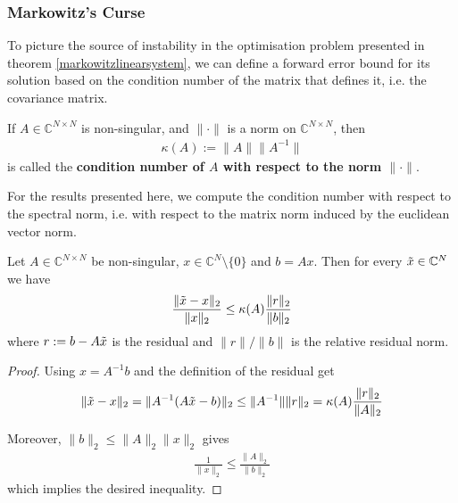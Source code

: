     \subsubsection{Markowitz's Curse}\label{markowitzscursesec}
        
		
		To picture the source of instability in the optimisation problem presented in theorem \ref{markowitzlinearsystem}, we can define a forward error bound for its solution based on the condition number of the matrix that defines it, i.e. the covariance matrix.
		
		\begin{definition}
		    If $A \in \mathbb{C}^{N \times N}$ is non-singular, and $\| \cdot \|$ is a norm on $\mathbb{C}^{N \times N}$, then
		    \begin{align*}
		        \kappa(A) := \| A \| \| A^{-1} \|
		    \end{align*}
		    is called the \textbf{condition number of $A$ with respect to the norm $\| \cdot \|$}.
		\end{definition}
		
		For the results presented here, we compute the condition number with respect to the spectral norm, i.e. with respect to the matrix norm induced by the euclidean vector norm.
		
		\begin{theorem}
			Let $A \in \mathbb{C}^{N \times N}$ be non-singular, $x \in \mathbb{C}^N \setminus \{ 0 \}$ and $b = Ax$. Then for every $\Tilde{x} \in \mathbb{C}^N$ we have
			\begin{align*}
				\frac{\| \Tilde{x} - x \|_2}{\| x \|_2} \leq \kappa(A) \frac{\| r \|_2}{\| b \|_2}
			\end{align*}
			where $r := b - A \Tilde{x}$ is the residual and $\| r \| / \| b \|$ is the relative residual norm.
		\end{theorem}
		
		\begin{proof}
			Using $x = A^{-1} b$ and the definition of the residual get
			\begin{align*}
				\| \Tilde{x} - x \|_2 = \| A^{-1} (A \Tilde{x} - b)\|_2 \leq \| A^{-1} \| \| r \|_2 = \kappa(A) \frac{\| r \|_2}{\| A \|_2}
			\end{align*}
			
			Moreover, $\| b \|_2 \leq \| A \|_2 \| x \|_2$ gives
			\begin{align*}
				\frac{1}{\| x \|_2} \leq \frac{\| A \|_2}{\| b \|_2}
			\end{align*}
			which implies the desired inequality.
		\end{proof}
		
